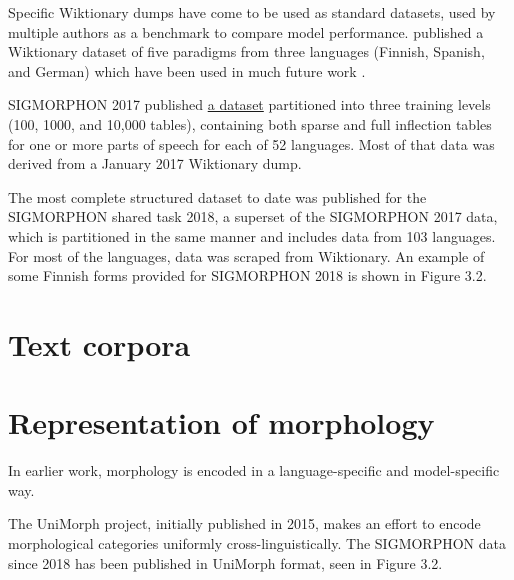 Specific Wiktionary dumps have come to be used as standard datasets, used by multiple authors as a benchmark to compare model performance. \cite{Durrett2013} published a Wiktionary dataset of five paradigms from three languages (Finnish, Spanish, and German) which have been used in much future work \parencite{Hulden2014} \parencite{Nicolai2015} \parencite{Ahlberg2015} \parencite{Faruqui2015}.

SIGMORPHON 2017 published \href{https://github.com/sigmorphon/conll2017/tree/master/all}{a dataset} partitioned into three training levels (100, 1000, and 10,000 tables), containing both sparse and full inflection tables for one or more parts of speech for each of 52 languages. Most of that data was derived from a January 2017 Wiktionary dump. \parencite{Cotterell2017} 

The most complete structured dataset to date was published for the SIGMORPHON shared task 2018, a superset of the SIGMORPHON 2017 data, which is partitioned in the same manner and includes data from 103 languages. For most of the languages, data was scraped from Wiktionary. An example of some Finnish forms provided for SIGMORPHON 2018 is shown in Figure 3.2.

\section{Text corpora}

\section{Representation of morphology}

In earlier work, morphology is encoded in a language-specific and model-specific way.

\parencite{Luong2013} The UniMorph project, initially published in 2015, makes an effort to encode morphological categories uniformly cross-linguistically. \parencite{SylakGlassman2015} \parencite{SylakGlassman2015a} \parencite{SylakGlassman2016} The SIGMORPHON data since 2018 has been published in UniMorph format, seen in Figure 3.2.